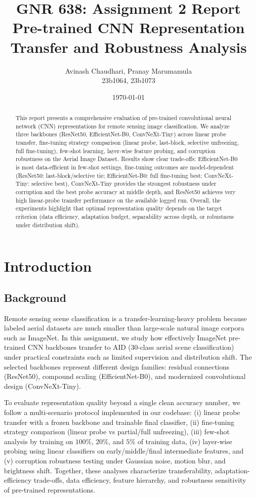 \documentclass[11pt,a4paper]{article}
\title{GNR 638: Assignment 2 Report\\
\large Pre-trained CNN Representation Transfer and Robustness Analysis}
\author{Avinash Chaudhari, Pranay Marumamula \\ 23b1064, 23b1073}
\date{\today}
\begin{document}
\maketitle

\begin{abstract}
This report presents a comprehensive evaluation of pre-trained convolutional neural network (CNN) representations for remote sensing image classification. We analyze three backbones (ResNet50, EfficientNet-B0, ConvNeXt-Tiny) across linear probe transfer, fine-tuning strategy comparison (linear probe, last-block, selective unfreezing, full fine-tuning), few-shot learning, layer-wise feature probing, and corruption robustness on the Aerial Image Dataset. Results show clear trade-offs: EfficientNet-B0 is most data-efficient in few-shot settings, fine-tuning outcomes are model-dependent (ResNet50: last-block/selective tie; EfficientNet-B0: full fine-tuning best; ConvNeXt-Tiny: selective best), ConvNeXt-Tiny provides the strongest robustness under corruption and the best probe accuracy at middle depth, and ResNet50 achieves very high linear-probe transfer performance on the available logged run. Overall, the experiments highlight that optimal representation quality depends on the target criterion (data efficiency, adaptation budget, separability across depth, or robustness under distribution shift).
\end{abstract}

\tableofcontents
\newpage

\section{Introduction}
\subsection{Background}
Remote sensing scene classification is a transfer-learning-heavy problem because labeled aerial datasets are much smaller than large-scale natural image corpora such as ImageNet. In this assignment, we study how effectively ImageNet pre-trained CNN backbones transfer to AID (30-class aerial scene classification) under practical constraints such as limited supervision and distribution shift. The selected backbones represent different design families: residual connections (ResNet50), compound scaling (EfficientNet-B0), and modernized convolutional design (ConvNeXt-Tiny).

To evaluate representation quality beyond a single clean accuracy number, we follow a multi-scenario protocol implemented in our codebase: (i) linear probe transfer with a frozen backbone and trainable final classifier, (ii) fine-tuning strategy comparison (linear probe vs partial/full unfreezing), (iii) few-shot analysis by training on $100\%$, $20\%$, and $5\%$ of training data, (iv) layer-wise probing using linear classifiers on early/middle/final intermediate features, and (v) corruption robustness testing under Gaussian noise, motion blur, and brightness shift. Together, these analyses characterize transferability, adaptation-efficiency trade-offs, data efficiency, feature hierarchy, and robustness sensitivity of pre-trained representations.
\end{document}
